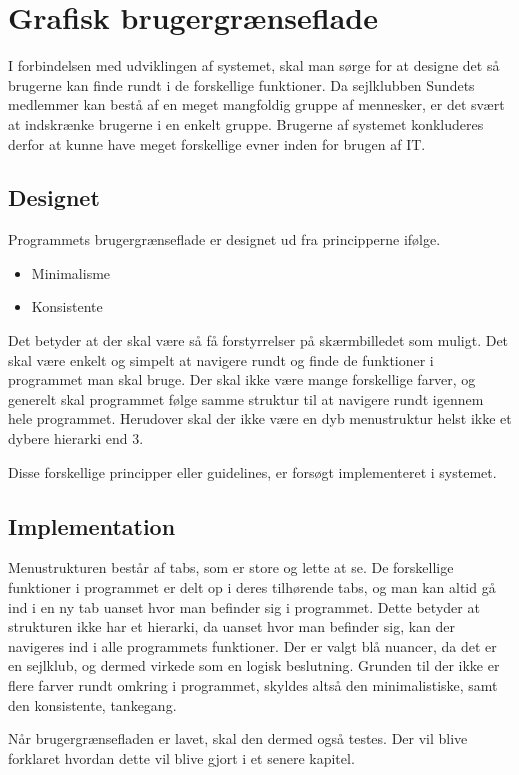 \section{Grafisk brugergrænseflade} \label{chap:GUI}

I forbindelsen med udviklingen af systemet, skal man sørge for at designe det så brugerne kan finde rundt i de forskellige funktioner. Da sejlklubben Sundets medlemmer kan bestå af en meget mangfoldig gruppe af mennesker, er det svært at indskrænke brugerne i en enkelt gruppe. Brugerne af systemet konkluderes derfor at kunne have meget forskellige evner inden for brugen af IT.

\subsection{Designet} \label{sec:Designet}

Programmets brugergrænseflade er designet ud fra principperne ifølge. \citep{gui1} 

\begin{itemize}
	\item Minimalisme
	\item Konsistente
\end{itemize}

Det betyder at der skal være så få forstyrrelser på skærmbilledet som muligt. Det skal være enkelt og simpelt at navigere rundt og finde de funktioner i programmet man skal bruge. Der skal ikke være mange forskellige farver, og generelt skal programmet følge samme struktur til at navigere rundt igennem hele programmet. Herudover skal der ikke være en dyb menustruktur helst ikke et dybere hierarki end 3.

Disse forskellige principper eller guidelines, er forsøgt implementeret i systemet.

\subsection{Implementation}\label{sec:Implementation}

Menustrukturen består af tabs, som er store og lette at se. De forskellige funktioner i programmet er delt op i deres tilhørende tabs, og man kan altid gå ind i en ny tab uanset hvor man befinder sig i programmet. Dette betyder at strukturen ikke har et hierarki, da uanset hvor man befinder sig, kan der navigeres ind i alle programmets funktioner. Der er valgt blå nuancer, da det er en sejlklub, og dermed virkede som en logisk beslutning. Grunden til der ikke er flere farver rundt omkring i programmet, skyldes altså den minimalistiske, samt den konsistente, tankegang.


Når brugergrænsefladen er lavet, skal den dermed også testes. Der vil blive forklaret hvordan dette vil blive gjort i et senere kapitel. 